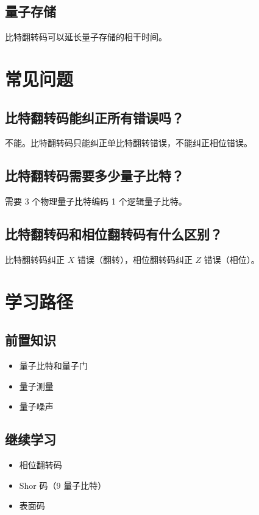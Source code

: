 \documentclass[12pt,a4paper]{article}
\begin{document}
\subsection{量子存储}

比特翻转码可以延长量子存储的相干时间。

\section{常见问题}

\subsection{比特翻转码能纠正所有错误吗？}

不能。比特翻转码只能纠正单比特翻转错误，不能纠正相位错误。

\subsection{比特翻转码需要多少量子比特？}

需要 3 个物理量子比特编码 1 个逻辑量子比特。

\subsection{比特翻转码和相位翻转码有什么区别？}

比特翻转码纠正 $X$ 错误（翻转），相位翻转码纠正 $Z$ 错误（相位）。

\section{学习路径}

\subsection{前置知识}
\begin{itemize}
  \item 量子比特和量子门
  \item 量子测量
  \item 量子噪声
\end{itemize}

\subsection{继续学习}
\begin{itemize}
  \item 相位翻转码
  \item Shor 码（9 量子比特）
  \item 表面码
\end{itemize}
\end{document}
